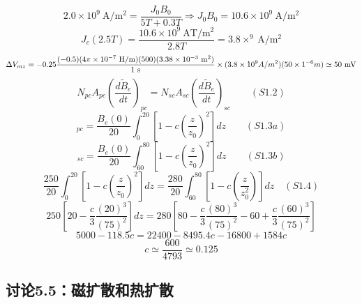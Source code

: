 \begin{equation}%
2.0\times 10^{9}\ \mathrm{A/m^{2}}=\frac{J_{0}B_{0}}{5T+0.3T}\Rightarrow J_{0}B_{0}=10.6\times10^{9}\ \mathrm{A/m^{2}}
\end{equation}
\begin{equation}%
J_{c}(2.5T)=\frac{10.6\times10^{9}\ \mathrm{AT/m^{2}}}{2.8T}=3.8\times^{9}\ \mathrm{A/m^{2}}
\end{equation}
\begin{equation}%
\Delta V_{mz}=-0.25\frac{(-0.5)(4\pi\times10^{-7}\ \mathrm{H/m})(500)(3.38\times10^{-3}\ \mathrm{m^{2}})}{1\ \mathrm{s}}\\
\times(3.8\times10^{9}A/m^{2})(50\times1^{-6}m)
\simeq 50\ \mathrm{mV}
\end{equation}
\begin{equation}%
N_{pc}A_{pc}(\frac{d\tilde{B}_{e}}{dt})_{pc}=N_{sc}A_{sc}(\frac{d\tilde{B}_{e}}{dt})_{sc}\qquad(S1.2)
\end{equation}
\begin{equation}%
[\tilde{B}_{e}]_{pc}=\frac{B_{e}(0)}{20}\int_{0}^{20}[1-c(\frac{z}{z_{0}})^{2}]dz\qquad(S1.3a)
\end{equation}
\begin{equation}%
[\tilde{B}_{e}]_{sc}=\frac{B_{e}(0)}{20}\int_{60}^{80}[1-c(\frac{z}{z_{0}})^{2}]dz\qquad(S1.3b)
\end{equation}
\begin{equation}%
\frac{250}{20}\int_{0}^{20}[1-c(\frac{z}{z_{0}})^{2}]dz=\frac{280}{20}\int_{60}^{80}[1-c(\frac{z}{z_{0}^{2}})]dz\quad(S1.4)
\end{equation}
\begin{equation}%
250[20-\frac{c}{3}\frac{(20)^{3}}{(75)^{2}}]dz=280[80-\frac{c}{3}\frac{(80)^{3}}{(75)^{2}}-60+\frac{c}{3}\frac{(60)^{3}}{(75)^{2}}]
\end{equation}
\begin{equation}%
5000-118.5c=22400-8495.4c-16800+1584c
\end{equation}
\begin{equation}%
c\simeq\frac{600}{4793}\simeq0.125
\end{equation}



\subsection{讨论5.5：磁扩散和热扩散}

